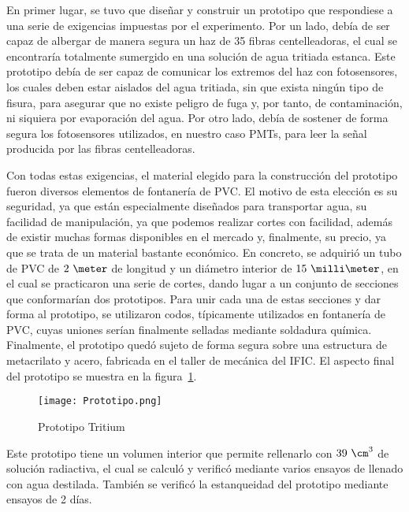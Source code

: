 En primer lugar, se tuvo que diseñar y construir un prototipo que respondiese a una serie de exigencias impuestas por el experimento. Por un lado,  debía de ser capaz de albergar de manera segura  un haz de 35 fibras centelleadoras, el cual se encontraría totalmente sumergido en una solución de agua tritiada estanca. Este prototipo debía de ser capaz de comunicar los extremos del haz con fotosensores, los cuales deben estar aislados del agua tritiada, sin que exista ningún tipo de fisura, para asegurar que no existe peligro de fuga y, por tanto, de contaminación, ni siquiera por evaporación del agua. Por otro lado, debía de sostener de forma segura los fotosensores utilizados, en nuestro caso PMTs, para leer la señal producida por las  fibras centelleadoras.

Con todas estas exigencias, el material elegido para la construcción del prototipo fueron diversos elementos de fontanería de PVC. El motivo de esta elección  es su seguridad, ya que están especialmente diseñados para transportar  agua, su facilidad de manipulación, ya que podemos realizar cortes con facilidad,  además de existir muchas formas disponibles en el mercado y, finalmente,  su precio, ya que se trata de un material bastante económico. 
En concreto, se adquirió un tubo de PVC de $2~\meter$ de longitud y un diámetro interior de $15~\milli\meter$, en el cual se practicaron una serie de cortes, dando lugar a un conjunto de secciones que conformarían dos prototipos. Para unir cada una de estas secciones y dar forma al prototipo, se utilizaron codos, típicamente utilizados en fontanería de PVC, cuyas uniones serían finalmente selladas mediante soldadura química. Finalmente, el prototipo quedó sujeto de forma segura sobre una estructura de metacrilato y acero, fabricada en el taller de mecánica del IFIC. El aspecto final del prototipo se muestra en la figura~\ref{prototipo}.
\begin{figure}[hbtp]
\centering
\texttt{[image: Prototipo.png]}
\caption{ Prototipo Tritium\label{prototipo}}
\end{figure}
Este prototipo tiene un volumen interior que permite rellenarlo con   $39~\cm^3$ de solución radiactiva, el cual se calculó y verificó mediante varios ensayos de llenado con agua destilada. También se verificó la estanqueidad del prototipo mediante ensayos de 2 días. 

